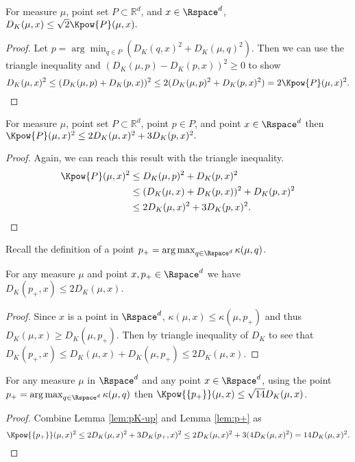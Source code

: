 \documentclass[11pt]{myclass}
\begin{document}
\begin{theorem}
\label{thm:powK-low}
For measure $\mu$, point set $P \subset \mathbb{R}^d$, and $x \in \Rspace^d$, 
$
D_K(\mu,x) \leq \sqrt{2} \Kpow{P}(\mu,x).
$
\end{theorem}
\begin{proof}
Let $p = \arg \min_{q \in P}  \left( D_K(q,x)^2 + D_K(\mu,q)^2 \right)$.  Then we can use the triangle inequality and $(D_K(\mu,p) - D_K(p,x))^2 \geq 0$ to show
\[
D_K(\mu,x)^2 
\leq 
(D_K(\mu,p) + D_K(p,x))^2 
\leq 
2 (D_K(\mu,p)^2 + D_K(p,x)^2)
=
2 \Kpow{P}(\mu,x)^2. \qedhere
\]
\end{proof}






\begin{lemma}
\label{lem:pK-up}
For measure $\mu$, point set $P \subset \mathbb{R}^d$, point $p \in P$, and point $x \in \Rspace^d$  then
$
\Kpow{P}(\mu,x)^2 \leq 2 D_K(\mu,x)^2 + 3 D_K(p,x)^2.
$
\end{lemma}
\begin{proof}
Again, we can reach this result with the triangle inequality. 
\begin{align*}
\Kpow{P}(\mu,x)^2 
&\leq 
D_K(\mu,p)^2 + D_K(p,x)^2 
\\ &\leq 
(D_K(\mu,x) + D_K(p,x))^2 + D_K(p,x)^2 
\\ &\leq
2D_K(\mu,x)^2 + 3 D_K(p,x)^2. \qedhere
\end{align*}
\end{proof}


Recall the definition of a point $p_+ = \arg \max_{q \in \Rspace^d} \kappa(\mu,q)$.  
\begin{lemma}
\label{lem:p+}
For any measure $\mu$ and point $x, p_+ \in \Rspace^d$ we have $D_K(p_+,x) \leq 2 D_K(\mu,x)$.  
\end{lemma}
\begin{proof}
Since $x$ is a point in $\Rspace^d$,  $\kappa(\mu,x) \leq \kappa(\mu,p_+)$ and thus $D_K(\mu,x) \geq D_K(\mu,p_+)$.  Then by triangle inequality of $D_K$ to see that 
$D_K(p_+,x) \leq D_K(\mu,x) + D_K(\mu,p_+) \leq 2 D_K(\mu,x)$. 
\end{proof}
 
\begin{theorem}
\label{thm:powK-up}
For any measure $\mu$ in $\Rspace^d$ and any point $x \in \Rspace^d$, using the point $p_+ = \arg \max_{q \in \Rspace^d} \kappa(\mu,q)$ then 
$\Kpow{\{p_+\}}(\mu,x) \leq \sqrt{14} D_K(\mu,x)$.  
\end{theorem}
\begin{proof}
Combine Lemma \ref{lem:pK-up} and Lemma \ref{lem:p+} as
\[
\Kpow{\{p_+\}}(\mu,x)^2 
\leq 
2 D_K(\mu,x)^2 + 3 D_K(p_+,x)^2
\leq
2 D_K(\mu,x)^2 + 3 (4 D_K(\mu,x)^2)
=
14 D_K(\mu,x)^2. \qedhere
\]
\end{proof}
\end{document}

